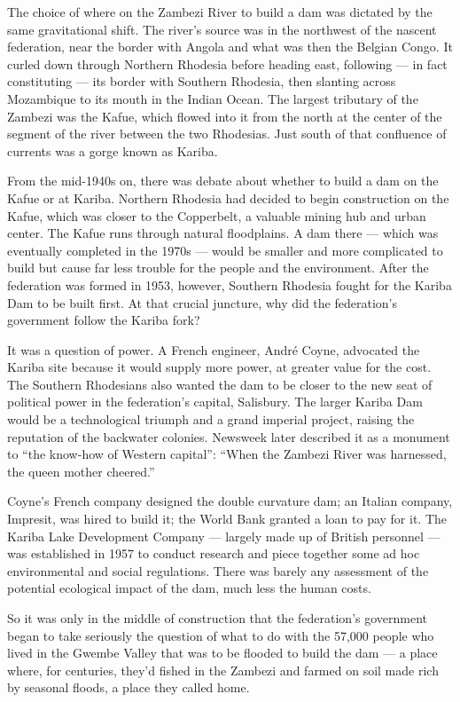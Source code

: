 The choice of where on the Zambezi River to build a dam was dictated by
the same gravitational shift. The river's source was in the northwest of
the nascent federation, near the border with Angola and what was then
the Belgian Congo. It curled down through Northern Rhodesia before
heading east, following --- in fact constituting --- its border with
Southern Rhodesia, then slanting across Mozambique to its mouth in the
Indian Ocean. The largest tributary of the Zambezi was the Kafue, which
flowed into it from the north at the center of the segment of the river
between the two Rhodesias. Just south of that confluence of currents was
a gorge known as Kariba.

From the mid-1940s on, there was debate about whether to build a dam on
the Kafue or at Kariba. Northern Rhodesia had decided to begin
construction on the Kafue, which was closer to the Copperbelt, a
valuable mining hub and urban center. The Kafue runs through natural
floodplains. A dam there --- which was eventually completed in the 1970s
--- would be smaller and more complicated to build but cause far less
trouble for the people and the environment. After the federation was
formed in 1953, however, Southern Rhodesia fought for the Kariba Dam to
be built first. At that crucial juncture, why did the federation's
government follow the Kariba fork?

It was a question of power. A French engineer, André Coyne, advocated
the Kariba site because it would supply more power, at greater value for
the cost. The Southern Rhodesians also wanted the dam to be closer to
the new seat of political power in the federation's capital, Salisbury.
The larger Kariba Dam would be a technological triumph and a grand
imperial project, raising the reputation of the backwater colonies.
Newsweek later described it as a monument to ``the know-how of Western
capital'': ``When the Zambezi River was harnessed, the queen mother
cheered.''

Coyne's French company designed the double curvature dam; an Italian
company, Impresit, was hired to build it; the World Bank granted a loan
to pay for it. The Kariba Lake Development Company --- largely made up
of British personnel --- was established in 1957 to conduct research and
piece together some ad hoc environmental and social regulations. There
was barely any assessment of the potential ecological impact of the dam,
much less the human costs.

So it was only in the middle of construction that the federation's
government began to take seriously the question of what to do with the
57,000 people who lived in the Gwembe Valley that was to be flooded to
build the dam --- a place where, for centuries, they'd fished in the
Zambezi and farmed on soil made rich by seasonal floods, a place they
called home.

